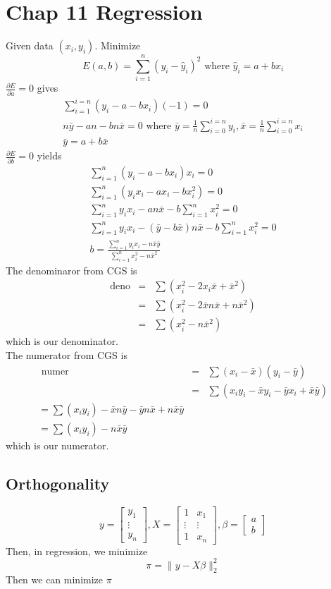 \documentclass{article}
\newcommand{\beq}{\begin{equation}}
\newcommand{\eeq}{\end{equation}}
\newcommand{\ber}{\begin{eqnarray}}
\newcommand{\eer}{\end{eqnarray}}
\newcommand{\pdd}[2]{\frac{\partial{#1}}{\partial{#2}}}
\begin{document}
\section{Chap 11 Regression}
Given data $(x_i,y_i)$. Minimize
\beq
E(a,b) = \sum_{i=1}^{n}(y_i - \hat{y}_i)^2 \text{ where } \hat{y}_i = a +bx_i
\eeq
$\pdd{E}{a}=0$ gives
\ber
\sum_{i=1}^{i=n}(y_i-a-bx_i)(-1) = 0 \\
n\bar{y} - an -bn\bar{x} = 0 \text{ where } \bar{y} = \frac{1}{n}\sum_{i=0}^{i=n}y_i, \bar{x} = \frac{1}{n}\sum_{i=0}^{i=n}x_i \\
\bar{y} = a + b\bar{x}  
\eer
$\pdd{E}{b}=0$ yields
\ber
\sum_{i=1}^{n}(y_i - a - bx_i)x_i = 0 \\
\sum_{i=1}^{n}(y_ix_i - ax_i -bx_i^2) = 0\\
\sum_{i=1}^{n}y_ix_i - an\bar{x} - b\sum_{i=1}^n x_i^2 = 0\\
\sum_{i=1}^{n}y_ix_i - ( \bar{y} - b\bar{x})n\bar{x} - b\sum_{i=1}^n x_i^2=0\\
b = \frac{\sum_{i=1}^{n}y_ix_i-n\bar{x}\bar{y}}{\sum_{i=1}^{n}x_i^2- n\bar{x}^2}
\eer
The denominaror from CGS is
\ber
\text{deno} &=& \sum( x_i^2 - 2x_i\bar{x} + \bar{x}^2) \\
&=& \sum ( x_i^2 - 2\bar{x}n\bar{x} + n\bar{x}^2) \\
&=& \sum ( x_i^2 - n\bar{x}^2)
\eer
which is our denominator.\\
The numerator from CGS is
\ber
\text{ numer } &=& \sum(x_i-\bar{x})(y_i-\bar{y})\\
&=& \sum(x_iy_i - \bar{x}y_i -\bar{y}x_i + \bar{x}\bar{y})\\
=\sum(x_iy_i) - \bar{x}n\bar{y}  - \bar{y}n\bar{x} + n\bar{x}\bar{y} \\
=\sum(x_iy_i) - n\bar{x}\bar{y}
\eer
which is our numerator.
\subsection{Orthogonality}
\beq
y = \begin{bmatrix}y_1 \\ \vdots \\ y_n \end{bmatrix}, X = \begin{bmatrix}1 & x_1\\  \vdots & \vdots \\ 1 & x_n \end{bmatrix}, \beta =  \begin{bmatrix}a \\ b \end{bmatrix}
\eeq
Then, in regression, we minimize
\beq
\pi = \|y-X\beta\|_2^2
\eeq
Then we can minimize $\pi$ 
\end{document}
